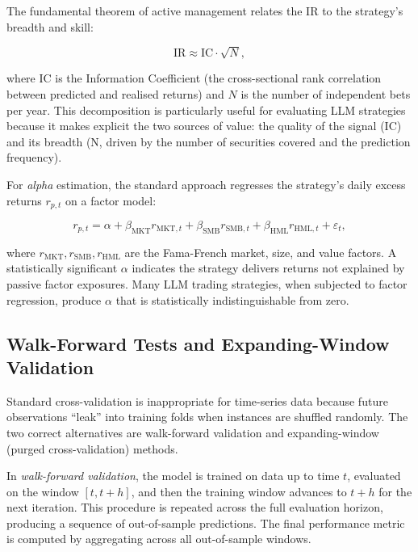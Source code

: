 The fundamental theorem of active management \cite{grinold1999active} relates the IR
to the strategy's breadth and skill:

\begin{equation}
  \text{IR} \approx \text{IC} \cdot \sqrt{N},
  \label{eq:ch13-fundamental-law}
\end{equation}

where IC is the Information Coefficient (the cross-sectional rank correlation between
predicted and realised returns) and $N$ is the number of independent bets per year.
This decomposition is particularly useful for evaluating LLM strategies because it
makes explicit the two sources of value: the quality of the signal (IC) and its
breadth (N, driven by the number of securities covered and the prediction frequency).

For \emph{alpha} estimation, the standard approach regresses the strategy's daily
excess returns $r_{p,t}$ on a factor model:

\begin{equation}
  r_{p,t} = \alpha + \beta_{\text{MKT}} r_{\text{MKT},t} + \beta_{\text{SMB}}
            r_{\text{SMB},t} + \beta_{\text{HML}} r_{\text{HML},t} + \varepsilon_t,
  \label{eq:ch13-factor-alpha}
\end{equation}

where $r_{\text{MKT}}, r_{\text{SMB}}, r_{\text{HML}}$ are the Fama-French
\cite{fama1993common} market, size, and value factors. A statistically significant
$\alpha$ indicates the strategy delivers returns not explained by passive factor
exposures. Many LLM trading strategies, when subjected to factor regression, produce
$\alpha$ that is statistically indistinguishable from zero.

\subsection{Walk-Forward Tests and Expanding-Window Validation}
\label{sec:ch13-walk-forward-tests}

Standard cross-validation is inappropriate for time-series data because future
observations ``leak'' into training folds when instances are shuffled randomly. The
two correct alternatives are walk-forward validation and expanding-window (purged
cross-validation) methods.

In \emph{walk-forward validation}, the model is trained on data up to time $t$,
evaluated on the window $[t, t + h]$, and then the training window advances to
$t + h$ for the next iteration. This procedure is repeated across the full evaluation
horizon, producing a sequence of out-of-sample predictions. The final performance
metric is computed by aggregating across all out-of-sample windows.

